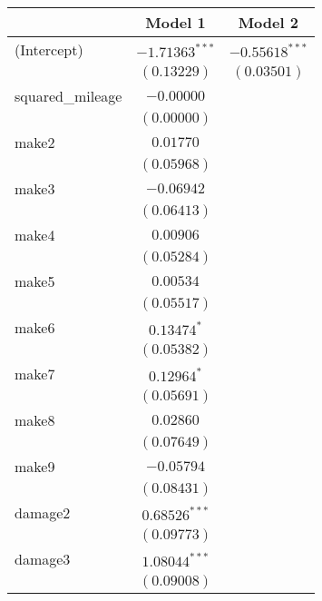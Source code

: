 
\begin{table}
\begin{center}
\begin{tabular}{l c c}
\hline
 & Model 1 & Model 2 \\
\hline
(Intercept)      & $-1.71363^{***}$ & $-0.55618^{***}$ \\
                 & $(0.13229)$      & $(0.03501)$      \\
squared\_mileage & $-0.00000$       &                  \\
                 & $(0.00000)$      &                  \\
make2            & $0.01770$        &                  \\
                 & $(0.05968)$      &                  \\
make3            & $-0.06942$       &                  \\
                 & $(0.06413)$      &                  \\
make4            & $0.00906$        &                  \\
                 & $(0.05284)$      &                  \\
make5            & $0.00534$        &                  \\
                 & $(0.05517)$      &                  \\
make6            & $0.13474^{*}$    &                  \\
                 & $(0.05382)$      &                  \\
make7            & $0.12964^{*}$    &                  \\
                 & $(0.05691)$      &                  \\
make8            & $0.02860$        &                  \\
                 & $(0.07649)$      &                  \\
make9            & $-0.05794$       &                  \\
                 & $(0.08431)$      &                  \\
damage2          & $0.68526^{***}$  &                  \\
                 & $(0.09773)$      &                  \\
damage3          & $1.08044^{***}$  &                  \\
                 & $(0.09008)$      &                  \\

\end{tabular}
\end{center}
\end{table}
